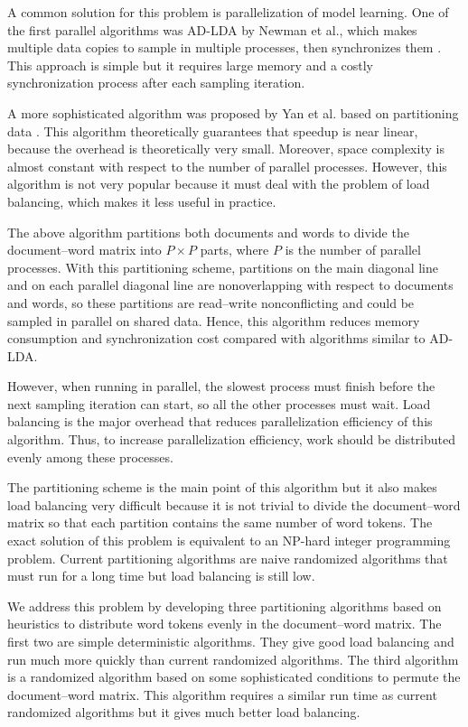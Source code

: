 \documentclass[10pt,conference]{IEEEtran}
\begin{document}
A common solution for this problem is parallelization of model learning. One of the first parallel algorithms was AD-LDA by Newman et al., which makes multiple data copies to sample in multiple processes, then synchronizes them \cite{newman2007distributed}. This approach is simple but it requires large memory and a costly synchronization process after each sampling iteration. 

A more sophisticated algorithm was proposed by Yan et al. based on partitioning data \cite{yan2009parallel}. This algorithm theoretically guarantees that speedup is near linear, because the overhead is theoretically very small. Moreover, space complexity is almost constant with respect to the number of parallel processes. However, this algorithm is not very popular because it must deal with the problem of load balancing, which makes it less useful in practice.

The above algorithm partitions both documents and words to divide the document--word matrix into $P \times P$ parts, where $P$ is the number of parallel processes. With this partitioning scheme, partitions on the main diagonal line and on each parallel diagonal line are nonoverlapping with respect to documents and words, so these partitions are read--write nonconflicting and could be sampled in parallel on shared data. Hence, this algorithm reduces memory consumption and synchronization cost compared with algorithms similar to AD-LDA.

However, when running in parallel, the slowest process must finish before the next sampling iteration can start, so all the other processes must wait. Load balancing is the major overhead that reduces parallelization efficiency of this algorithm. Thus, to increase parallelization efficiency, work should be distributed evenly among these processes.

The partitioning scheme is the main point of this algorithm but it also makes load balancing very difficult because it is not trivial to divide the document--word matrix so that each partition contains the same number of word tokens. The exact solution of this problem is equivalent to an NP-hard integer programming problem. Current partitioning algorithms are naive randomized algorithms that must run for a long time but load balancing is still low.

We address this problem by developing three partitioning algorithms based on heuristics to distribute word tokens evenly in the document--word matrix. The first two are simple deterministic algorithms. They give good load balancing and run much more quickly than current randomized algorithms. The third algorithm is a randomized algorithm based on some sophisticated conditions to permute the document--word matrix. This algorithm requires a similar run time as current randomized algorithms but it gives much better load balancing.
\end{document}
